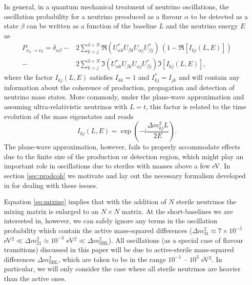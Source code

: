 In general, in a quantum mechanical treatment of neutrino oscillations, the oscillation probability for a neutrino preoduced as a flavour $\alpha$ to be detected as a state $\beta$ can be written as a function of the baseline $L$ and the neutrino energy $E$ as
%
%
\begin{align} \label{eq:general_prob}
P_{\nu_{\alpha} \to \nu_{\beta}}= \delta_{\alpha \beta} -& 2 \sum_{k>j}^{3+N} \Re(U_{\alpha k}^* U_{\beta k} U_{\alpha j} U_{\beta j}^*)\, \left(1 - \Re\left[I_{k j}(L, E)\right]\right) \nonumber\\ -& 2\sum_{k>j}^{3+N} \Im(U_{\alpha k}^* U_{\beta k} U_{\alpha j} U_{\beta j}^*) \Im\left[I_{k j}(L, E) \right],
\end{align}
where the factor $I_{k j}(L, E)$ satisfies $I_{k k} = 1$ and $I^*_{k j} = I_{j k}$ \cite{Akhmedov2009a} and will contain any information about the coherence of production, propagation and detection of neutrino mass states. More commonly, under the plane-wave approximation and assuming ultra-relativistic neutrinos with $L = t$, this factor is related to the time evolution of the mass eigenstates and reads
%
\begin{equation} \label{eq:Iplanewave}
I_{k j}(L, E) = \exp\left(-i \frac{\Delta m^2_{k j} L}{2 E}\right).
\end{equation}
%
The plane-wave approximation, however, fails to properly accommodate effects due to the finite size of the production or detection region, which might play an important role in oscillations due to steriles with masses above a few eV. In section \ref{sec:prodcoh} we motivate and lay out the necessary formalism developed in \cite{Akhmedov2009,Akhmedov2012} for dealing with these issues.

Equation \ref{eq:mixing} implies that with the addition of $N$ sterile neutrinos the mixing matrix is enlarged to an $N \times N$ matrix. At the short-baselines we are interested in, however, we can safely ignore any terms in the oscillation probability which contain the active mass-squared differences ($\Delta m^2_{31} \approx 7 \times 10^{-5}$ eV$^2 \ll\Delta m^2_{21} \approx 10^{-3}$ eV$^2 \ll \Delta m^2_{\text{SBL}}$). All oscillations (as a special case of flavour transitions) discussed in this paper will be due to active-sterile mass-squared differences $\Delta m^2_{\text{SBL}}$, which are taken to be in the range $10^{-1}$ -- $10^{3}$ eV$^2$. In particular, we will only consider the case where all sterile neutrinos are heavier than the active ones.   

